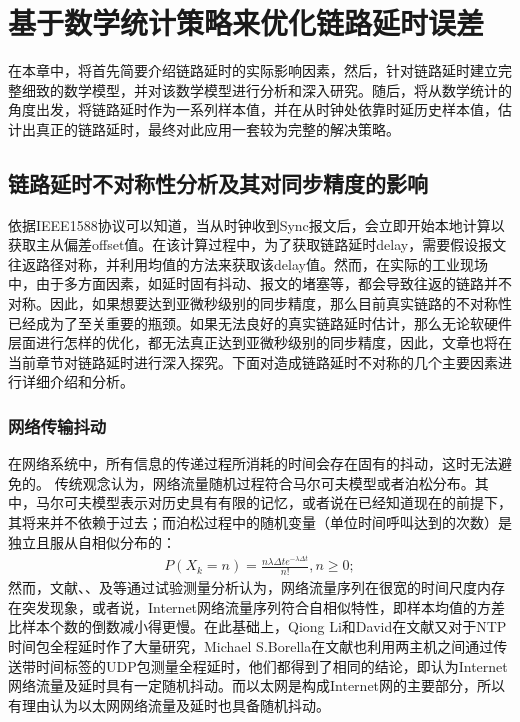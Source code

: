 
\chapter{基于数学统计策略来优化链路延时误差}
\label{chap:statistical_delay}
在本章中，将首先简要介绍链路延时的实际影响因素，然后，针对链路延时建立完整细致的数学模型，并对该数学模型进行分析和深入研究。随后，将从数学统计的角度出发，将链路延时作为一系列样本值，并在从时钟处依靠时延历史样本值，估计出真正的链路延时，最终对此应用一套较为完整的解决策略。

\section{链路延时不对称性分析及其对同步精度的影响}
依据IEEE1588协议可以知道，当从时钟收到Sync报文后，会立即开始本地计算以获取主从偏差offset值。在该计算过程中，为了获取链路延时delay，需要假设报文往返路径对称，并利用均值的方法来获取该delay值。然而，在实际的工业现场中，由于多方面因素，如延时固有抖动、报文的堵塞等，都会导致往返的链路并不对称。因此，如果想要达到亚微秒级别的同步精度，那么目前真实链路的不对称性已经成为了至关重要的瓶颈。如果无法良好的真实链路延时估计，那么无论软硬件层面进行怎样的优化，都无法真正达到亚微秒级别的同步精度，因此，文章也将在当前章节对链路延时进行深入探究。下面对造成链路延时不对称的几个主要因素进行详细介绍和分析。

\subsection{网络传输抖动}
在网络系统中，所有信息的传递过程所消耗的时间会存在固有的抖动，这时无法避免的。
传统观念认为，网络流量随机过程符合马尔可夫模型或者泊松分布。其中，马尔可夫模型表示对历史具有有限的记忆，或者说在已经知道现在的前提下，其将来并不依赖于过去；而泊松过程中的随机变量（单位时间呼叫达到的次数）是独立且服从自相似分布的\supercite{12}：
\begin {align}
P(X_{k} = n) = \frac{n\lambda\Delta t e^{- \lambda\Delta t}}{n!},n\geq 0;
\end{align}
然而，文献\parencite{13}、\parencite{14}、\parencite{15}及\parencite{16}等通过试验测量分析认为，网络流量序列在很宽的时间尺度内存在突发现象，或者说，Internet网络流量序列符合自相似特性，即样本均值的方差比样本个数的倒数减小得更慢。在此基础上，Qiong Li和David在文献\parencite{17}又对于NTP时间包全程延时作了大量研究，Michael S.Borella在文献\parencite{18}也利用两主机之间通过传送带时间标签的UDP包测量全程延时，他们都得到了相同的结论，即认为Internet网络流量及延时具有一定随机抖动。而以太网是构成Internet网的主要部分，所以有理由认为以太网网络流量及延时也具备随机抖动。

